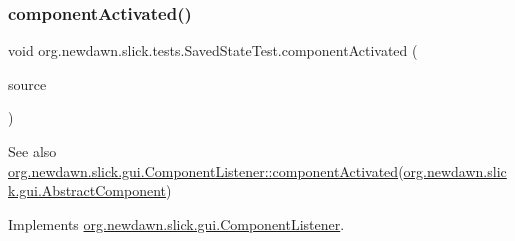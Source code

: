 \subsubsection{\texorpdfstring{component\+Activated()}{componentActivated()}}
{\footnotesize\ttfamily void org.\+newdawn.\+slick.\+tests.\+Saved\+State\+Test.\+component\+Activated (\begin{DoxyParamCaption}\item[{\mbox{\hyperlink{classorg_1_1newdawn_1_1slick_1_1gui_1_1_abstract_component}{Abstract\+Component}}}]{source }\end{DoxyParamCaption})\hspace{0.3cm}{\ttfamily [inline]}}

\begin{DoxySeeAlso}{See also}
\mbox{\hyperlink{interfaceorg_1_1newdawn_1_1slick_1_1gui_1_1_component_listener_a078740e03974ce07a757744a771e8626}{org.\+newdawn.\+slick.\+gui.\+Component\+Listener\+::component\+Activated}}(\mbox{\hyperlink{classorg_1_1newdawn_1_1slick_1_1gui_1_1_abstract_component}{org.\+newdawn.\+slick.\+gui.\+Abstract\+Component}}) 
\end{DoxySeeAlso}


Implements \mbox{\hyperlink{interfaceorg_1_1newdawn_1_1slick_1_1gui_1_1_component_listener_a078740e03974ce07a757744a771e8626}{org.\+newdawn.\+slick.\+gui.\+Component\+Listener}}.



